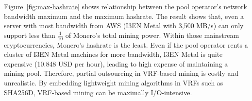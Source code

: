 Figure~\ref{fig:max-hashrate} shows relationship between the pool operator's network bandwidth maximum and the maximum hashrate.
The result shows that, even a server with most bandwidth from AWS (I3EN Metal with 3,500 MB/s) can only support less than $\frac{1}{10}$ of Monero's total mining power.
Within those mainstream cryptocurrencies, Monero's hashrate is the least.
Even if the pool operator rents a cluster of I3EN Metal machines for more bandwidth, I3EN Metal is quite expensive (10.848 USD per hour), leading to high expense of maintaining a mining pool.
Therefore, partial outsourcing in VRF-based mining is costly and unrealistic.
By embedding lightweight mining algorithms in VRFs such as SHA256D, VRF-based mining can be maximally I/O-intensive.
